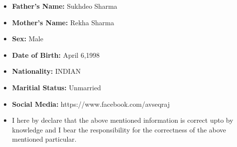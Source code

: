 \documentclass[a4paper,12pt]{memoir}
\begin{document}

  

\begin{itemize}
  \item{\textbf{Father's Name: }}{Sukhdeo Sharma}
  \item{\textbf{Mother's Name: }}{Rekha Sharma}
  \item{\textbf{Sex: }}{Male}
  \item{\textbf{Date of Birth: }}{April 6,1998}
  \item{\textbf{Nationality: }}{INDIAN}
  \item{\textbf{Maritial Status: }}{Unmarried}
  \item{\textbf{Social Media: }}{ https://www.facebook.com/avseqraj}
  \Sep
\end{itemize}


\begin{itemize}
 \item{}{I here by declare that the above mentioned information is correct upto by knowledge and I bear the responsibility for the 
correctness of the above mentioned particular.}
\Sep
\end{itemize}
\end{document}
